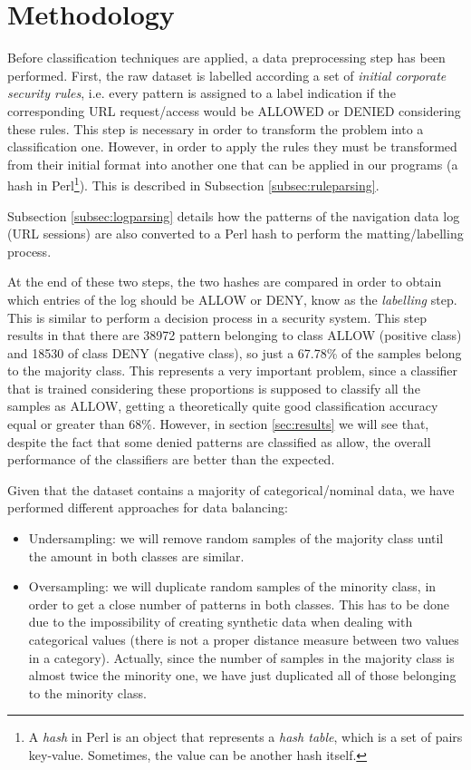 \documentclass{llncs}
\begin{document}
%
\section{Methodology}
\label{sec:methodology}

\noindent Before classification techniques are applied, a data preprocessing step has been performed. First, the raw dataset is labelled according a set of \textit{initial corporate security rules}, i.e. every pattern is assigned to a label indication if the corresponding URL request/access would be ALLOWED or DENIED considering these rules. This step is necessary in order to transform the problem into a classification one. However, in order to apply the rules they must be transformed from their initial format into another one that can be applied in our programs (a hash in Perl\footnote{A \textit{hash} in Perl is an object that represents a \textit{hash table}, which is a set of pairs key-value. Sometimes, the value can be another hash itself.}). This is described in Subsection \ref{subsec:ruleparsing}. 

Subsection \ref{subsec:logparsing} details how the patterns of the navigation data log (URL sessions) are also converted to a Perl hash to perform the matting/labelling process. 

At the end of these two steps, the two hashes are compared in order to obtain which entries of the log should be ALLOW or DENY, know as the \textit{labelling} step. This is similar to perform a decision process in a security system. This step results in that there are 38972 pattern belonging to class ALLOW (positive class) and 18530 of class DENY (negative class), so just a 67.78\% of the samples belong to the majority class. This represents a very important problem, since a classifier that is trained considering these proportions is supposed to classify all the samples as ALLOW, getting a theoretically quite good classification accuracy equal or greater than 68\%. However, in section \ref{sec:results} we will see that, despite the fact that some denied patterns are classified as allow, the overall performance of the classifiers are better than the expected.

Given that the dataset contains a majority of categorical/nominal data, we have performed different approaches for data balancing:
\begin{itemize}
\item Undersampling: we will remove random samples of the majority class until the amount in both classes are similar.
\item Oversampling: we will duplicate random samples of the minority class, in order to get a close number of patterns in both classes. This has to be done due to the impossibility of creating synthetic data when dealing with categorical values (there is not a proper distance measure between two values in a category). Actually, since the number of samples in the majority class is almost twice the minority one, we have just duplicated all of those belonging to the minority class.
\end{itemize}
\end{document}
